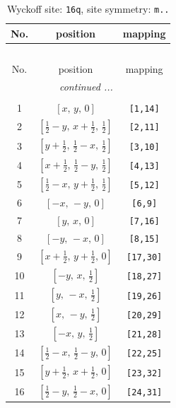 \documentclass[fleqn,8pt]{jsarticle}
\begin{document}
\renewcommand{\arraystretch}{1.2}
\begin{longtable}{ccc}
\caption{Wyckoff site: {\tt 16q}, site symmetry: {\tt m..}}
 \\
 \hline \hline
No. & position & mapping \\ \hline \endfirsthead

\multicolumn{2}{l}{\tablename\ \thetable{}} \\
 \hline \hline
No. & position & mapping \\ \hline \endhead

 \hline \hline
\multicolumn{2}{r}{\footnotesize\it continued ...} \\ \endfoot

 \hline \hline
\multicolumn{2}{r}{} \\ \endlastfoot

1 & $\left[ x,\, y,\, 0 \right]$ & {\tt [1,14]} \\ \hline
2 & $\left[ \frac{1}{2} - y,\, x + \frac{1}{2},\, \frac{1}{2} \right]$ & {\tt [2,11]} \\ \hline
3 & $\left[ y + \frac{1}{2},\, \frac{1}{2} - x,\, \frac{1}{2} \right]$ & {\tt [3,10]} \\ \hline
4 & $\left[ x + \frac{1}{2},\, \frac{1}{2} - y,\, \frac{1}{2} \right]$ & {\tt [4,13]} \\ \hline
5 & $\left[ \frac{1}{2} - x,\, y + \frac{1}{2},\, \frac{1}{2} \right]$ & {\tt [5,12]} \\ \hline
6 & $\left[ - x,\, - y,\, 0 \right]$ & {\tt [6,9]} \\ \hline
7 & $\left[ y,\, x,\, 0 \right]$ & {\tt [7,16]} \\ \hline
8 & $\left[ - y,\, - x,\, 0 \right]$ & {\tt [8,15]} \\ \hline
9 & $\left[ x + \frac{1}{2},\, y + \frac{1}{2},\, 0 \right]$ & {\tt [17,30]} \\ \hline
10 & $\left[ - y,\, x,\, \frac{1}{2} \right]$ & {\tt [18,27]} \\ \hline
11 & $\left[ y,\, - x,\, \frac{1}{2} \right]$ & {\tt [19,26]} \\ \hline
12 & $\left[ x,\, - y,\, \frac{1}{2} \right]$ & {\tt [20,29]} \\ \hline
13 & $\left[ - x,\, y,\, \frac{1}{2} \right]$ & {\tt [21,28]} \\ \hline
14 & $\left[ \frac{1}{2} - x,\, \frac{1}{2} - y,\, 0 \right]$ & {\tt [22,25]} \\ \hline
15 & $\left[ y + \frac{1}{2},\, x + \frac{1}{2},\, 0 \right]$ & {\tt [23,32]} \\ \hline
16 & $\left[ \frac{1}{2} - y,\, \frac{1}{2} - x,\, 0 \right]$ & {\tt [24,31]} \\
\end{longtable}
\end{document}
